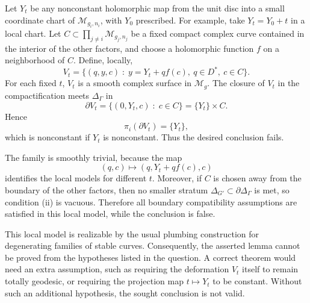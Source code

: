 \documentclass{article}
\begin{document}
Let \(Y_t\) be any nonconstant holomorphic map from the unit disc into a small coordinate chart of \(\mathcal M_{g_i,n_i}\), with \(Y_0\) prescribed. For example, take \(Y_t=Y_0+t\) in a local chart. Let \(C\subset \prod_{j\neq i}\mathcal M_{g_j,n_j}\) be a fixed compact complex curve contained in the interior of the other factors, and choose a holomorphic function \(f\) on a neighborhood of \(C\). Define, locally,
\[
V_t=\{(q,y,c)\;:\; y=Y_t+q f(c),\ q\in D^*,\ c\in C\}.
\]
For each fixed \(t\), \(V_t\) is a smooth complex surface in \(\mathcal M_g\). The closure of \(V_t\) in the compactification meets \(\Delta_\Gamma\) in
\[
\partial V_t=\{(0,Y_t,c)\;:\;c\in C\}
=\{Y_t\}\times C.
\]
Hence
\[
\pi_i(\partial V_t)=\{Y_t\},
\]
which is nonconstant if \(Y_t\) is nonconstant. Thus the desired conclusion fails.

The family is smoothly trivial, because the map
\[
(q,c)\longmapsto (q,Y_t+q f(c),c)
\]
identifies the local models for different \(t\). Moreover, if \(C\) is chosen away from the boundary of the other factors, then no smaller stratum \(\Delta_{G'}\subset \partial\Delta_\Gamma\) is met, so condition (ii) is vacuous. Therefore all boundary compatibility assumptions are satisfied in this local model, while the conclusion is false.

This local model is realizable by the usual plumbing construction for degenerating families of stable curves. Consequently, the asserted lemma cannot be proved from the hypotheses listed in the question. A correct theorem would need an extra assumption, such as requiring the deformation \(V_t\) itself to remain totally geodesic, or requiring the projection map \(t\mapsto Y_t\) to be constant. Without such an additional hypothesis, the sought conclusion is not valid.
\end{document}
